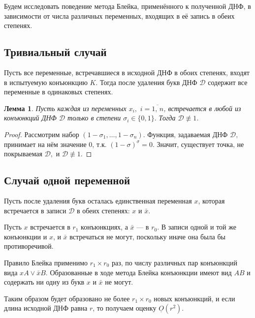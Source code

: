 \documentclass[12pt,a4paper,oneside,fleqn,leqno]{article}
\newtheorem{lemma}{Лемма}
\theoremstyle{definition}
\begin{document}
		Будем исследовать поведение метода Блейка, применённого к полученной ДНФ, в зависимости от числа различных переменных, входящих в её запись в обеих степенях.\par
		\subsection{Тривиальный случай}
			Пусть все переменные, встречавшиеся в исходной ДНФ в обоих степенях, входят в испытуемую конъюнкцию $K.$ Тогда после удаления букв ДНФ $\mathcal{D}$ содержит все переменные в одинаковых степенях.\par
			\begin{lemma}
				Пусть каждая из переменных $x_i,\,\,i = \overline{1,\,n}$, встречается в любой из конъюнкций ДНФ $\mathcal{D}$ только в степени $\sigma_i \in \{ 0, 1\}.$ Тогда $\mathcal{D} \not\equiv 1$.
			\end{lemma}
			\begin{proof}
				Рассмотрим набор $(1 - \sigma_1, \ldots, 1 - \sigma_n).$ Функция, задаваемая ДНФ $\mathcal{D},$ принимает на нём значение 0, т.к. $(1 - \sigma)^{\sigma} = 0.$ Значит, существует точка, не покрываемая $\mathcal{D},$ и $\mathcal{D} \not\equiv 1$.
			\end{proof}
		\subsection{Случай одной переменной}
			Пусть после удаления букв осталась единственная переменная $x$, которая встречается в записи $\mathcal{D}$ в обеих степенях: $x$ и $\bar{x}$.\par
			Пусть $x$ встречается в $r_1$ конъюнкциях, а $\bar{x}$ --- в $r_0.$ В записи одной и той же конъюнкции и $x$, и $\bar{x}$ встречаться не могут, поскольку иначе она была бы противоречивой.\par
			Правило Блейка применимо $r_1\times r_0$ раз, по числу различных пар конъюнкций вида $xA \vee \bar{x}B.$ Образованные в ходе метода Блейка конъюнкции имеют вид $AB$ и содержать ни одну из букв $x$ и $\bar{x}$ не могут.\par
			Таким образом будет образовано не более $r_1\times r_0$ новых конъюнкций, и если длина исходной ДНФ равна $r$, то получаем оценку $\underline{O}(r^2).$
\end{document}
